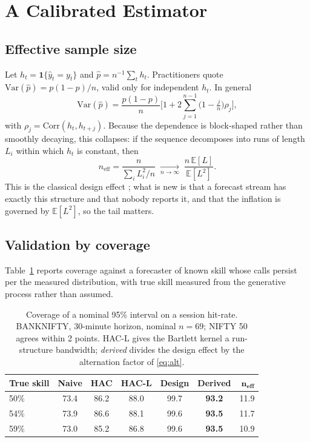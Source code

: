 \documentclass[runningheads]{llncs}
\begin{document}
\section{A Calibrated Estimator}
\label{sec:est}

\subsection{Effective sample size}

Let $h_t = \mathbf{1}\{\hat{y}_t = y_t\}$ and $\hat{p} = n^{-1}\sum_t h_t$.
Practitioners quote $\mathrm{Var}(\hat{p}) = p(1-p)/n$, valid only for independent
$h_t$. In general
\begin{equation}
\mathrm{Var}(\hat{p}) = \frac{p(1-p)}{n}
\Big[1 + 2\sum_{j=1}^{n-1}\big(1 - \tfrac{j}{n}\big)\rho_j\Big],
\label{eq:var}
\end{equation}
with $\rho_j = \mathrm{Corr}(h_t,h_{t+j})$. Because the dependence is
block-shaped rather than smoothly decaying, this collapses: if the sequence
decomposes into runs of length $L_i$ within which $h_t$ is constant, then
\begin{equation}
n_{\text{eff}} = \frac{n}{\sum_i L_i^2/n}
\;\xrightarrow[n\to\infty]{}\; \frac{n\,\mathbb{E}[L]}{\mathbb{E}[L^2]}.
\label{eq:neff}
\end{equation}
This is the classical design effect \cite{kish1965}; what is new is that a
forecast stream has exactly this structure and that nobody reports it, and that
the inflation is governed by $\mathbb{E}[L^2]$, so the tail matters.

\subsection{Validation by coverage}

Table~\ref{tab:cov} reports coverage against a forecaster of known skill whose
calls persist per the measured distribution, with true skill measured from the
generative process rather than assumed.

\begin{table}[htbp]
\caption{Coverage of a nominal 95\% interval on a session hit-rate. BANKNIFTY,
30-minute horizon, nominal $n=69$; NIFTY 50 agrees within 2 points. HAC-L gives
the Bartlett kernel a run-structure bandwidth; \emph{derived} divides the design
effect by the alternation factor of \eqref{eq:alt}.}
\label{tab:cov}
\centering
\footnotesize
\begin{tabular}{@{}lcccccr@{}}
\toprule
\textbf{True skill} & \textbf{Naive} & \textbf{HAC} & \textbf{HAC-L} &
\textbf{Design} & \textbf{Derived} & $\boldsymbol{n_{\text{eff}}}$ \\
\midrule
50\% & 73.4 & 86.2 & 88.0 & 99.7 & \textbf{93.2} & 11.9 \\
54\% & 73.9 & 86.6 & 88.1 & 99.6 & \textbf{93.5} & 11.7 \\
59\% & 73.0 & 85.2 & 86.8 & 99.6 & \textbf{93.5} & 10.9 \\
\bottomrule
\end{tabular}
\end{table}
\end{document}
